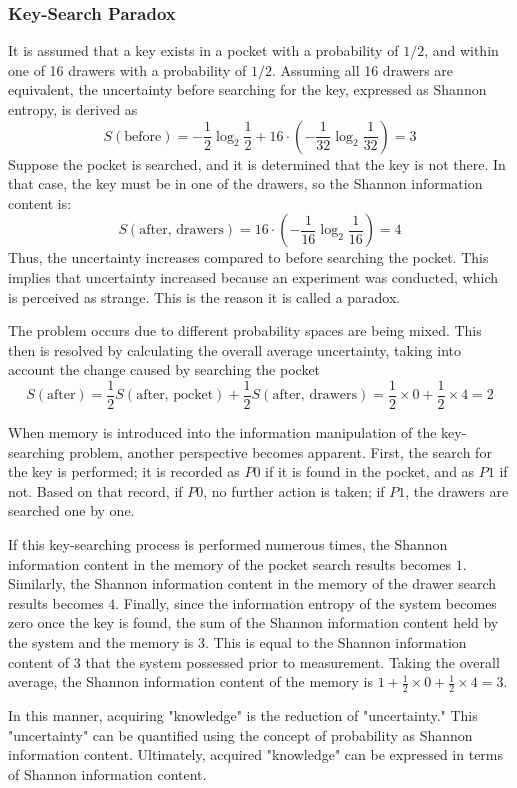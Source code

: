 \documentclass[../../../main.tex]{subfiles}
\begin{document}
\subsubsection{Key-Search Paradox}
It is assumed that a key exists in a pocket with a probability of $1/2$, and within one of 16 drawers with a probability of $1/2$. 
Assuming all 16 drawers are equivalent, the uncertainty before searching for the key, expressed as Shannon entropy, is derived as
\begin{equation*}
  S(\text{before}) = -\frac{1}{2} \log_2 \frac{1}{2} + 16 \cdot \left( -\frac{1}{32} \log_2 \frac{1}{32} \right) = 3
\end{equation*}
Suppose the pocket is searched, and it is determined that the key is not there. 
In that case, the key must be in one of the drawers, so the Shannon information content is:
\begin{equation*}
  S(\text{after, drawers}) = 16 \cdot \left( -\frac{1}{16} \log_2 \frac{1}{16} \right) = 4
\end{equation*}
Thus, the uncertainty increases compared to before searching the pocket. 
This implies that uncertainty increased because an experiment was conducted, which is perceived as strange. 
This is the reason it is called a paradox.

The problem occurs due to different probability spaces are being mixed. 
This then is resolved by calculating the overall average uncertainty, taking into account the change caused by searching the pocket
\begin{equation*}
  S(\text{after}) = \frac{1}{2} S(\text{after, pocket}) + \frac{1}{2} S(\text{after, drawers})
  = \frac{1}{2} \times 0 + \frac{1}{2} \times 4 = 2
\end{equation*}

When memory is introduced into the information manipulation of the key-searching problem, another perspective becomes apparent. 
First, the search for the key is performed; it is recorded as $P0$ if it is found in the pocket, and as $P1$ if not. 
Based on that record, if $P0$, no further action is taken; if $P1$, the drawers are searched one by one.

If this key-searching process is performed numerous times, the Shannon information content in the memory of the pocket search results becomes $1$. 
Similarly, the Shannon information content in the memory of the drawer search results becomes $4$. 
Finally, since the information entropy of the system becomes zero once the key is found, the sum of the Shannon information content held by the system and the memory is $3$. This is equal to the Shannon information content of $3$ that the system possessed prior to measurement.
Taking the overall average, the Shannon information content of the memory is $1 + \frac{1}{2} \times 0 + \frac{1}{2} \times 4 = 3$.

In this manner, acquiring "knowledge" is the reduction of "uncertainty." 
This "uncertainty" can be quantified using the concept of probability as Shannon information content. 
Ultimately, acquired "knowledge" can be expressed in terms of Shannon information content.
\end{document}
